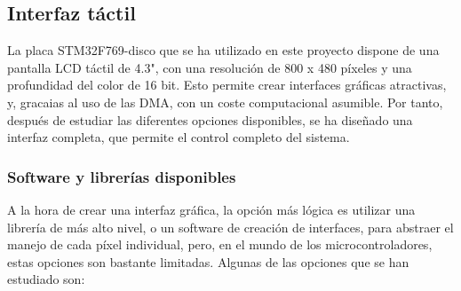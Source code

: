 \subsection{Interfaz táctil}

La placa STM32F769-disco que se ha utilizado en este proyecto dispone de una pantalla LCD táctil de 4.3", con una resolución de 800 x 480 píxeles y una profundidad del color de 16 bit. Esto permite crear interfaces gráficas atractivas, y, gracaias al uso de las DMA, con un coste computacional asumible. Por tanto, después de estudiar las diferentes opciones disponibles, se ha diseñado una interfaz completa, que permite el control completo del sistema.

\subsubsection{Software y librerías disponibles}
A la hora de crear una interfaz gráfica, la opción más lógica es utilizar una librería de más alto nivel, o un software de creación de interfaces, para abstraer el manejo de cada píxel individual, pero, en el mundo de los microcontroladores, estas opciones son bastante limitadas. Algunas de las opciones que se han estudiado son:

